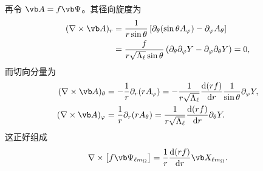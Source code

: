 再令 $\vb A=f\vb\Psi$。其径向旋度为
\begin{align}
(\nabla\times\vb A)_r
&=\frac{1}{r\sin\theta}
\left[\partial_\theta(\sin\theta A_\varphi)-\partial_\varphi A_\theta\right]\\
&=\frac{f}{r\sqrt{\Lambda_\ell}\sin\theta}
\left(\partial_\theta\partial_\varphi Y-\partial_\varphi\partial_\theta Y\right)=0,
\end{align}
而切向分量为
\begin{align}
(\nabla\times\vb A)_\theta
&=-\frac{1}{r}\partial_r(rA_\varphi)
=-\frac{1}{r\sqrt{\Lambda_\ell}}
\frac{\dd(rf)}{\dd r}\frac{1}{\sin\theta}\partial_\varphi Y,\\
(\nabla\times\vb A)_\varphi
&=\frac{1}{r}\partial_r(rA_\theta)
=\frac{1}{r\sqrt{\Lambda_\ell}}
\frac{\dd(rf)}{\dd r}\partial_\theta Y.
\end{align}
这正好组成
\begin{equation}
\nabla\times\bigl[f\vb\Psi_{\ell m_\Omega}\bigr]
=\frac{1}{r}\frac{\dd(rf)}{\dd r}\vb X_{\ell m_\Omega}.
\end{equation}

